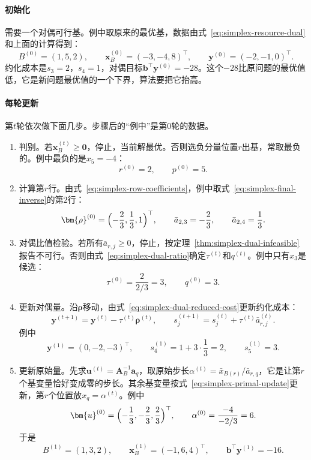 \paragraph{初始化}
需要一个对偶可行基。例中取原来的最优基，数据由式~\eqref{eq:simplex-resource-dual}和上面的计算得到：
\[
 B^{(0)}=(1,5,2),\qquad \bm{x}_B^{(0)}=(-3,-4,8)^\top,\qquad \bm{y}^{(0)}=(-2,-1,0)^\top.
\]
约化成本是$s_3=2$，$s_4=1$，对偶目标$\bm{b}^\top\bm{y}^{(0)}=-28$。这个$-28$比原问题的最优值低，它是新问题最优值的一个下界，算法要把它抬高。

\paragraph{每轮更新}
第$t$轮依次做下面几步。步骤后的“例中”是第$0$轮的数据。
\begin{enumerate}

 \item 判别。若$\bm{x}_B^{(t)}\geq\bm{0}$，停止，当前解最优。否则选负分量位置$r$出基，常取最负的。例中最负的是$x_5=-4$：
 \[
  r^{(0)}=2,\qquad p^{(0)}=5.
 \]

 \item 计算第$r$行。由式~\eqref{eq:simplex-row-coefficients}，例中取式~\eqref{eq:simplex-final-inverse}的第$2$行：
 \[
  \bm{\rho}^{(0)}=\Bigl(-\frac23,\frac13,1\Bigr)^\top,\qquad
  \bar{a}_{2,3}=-\frac23,\qquad \bar{a}_{2,4}=\frac13.
 \]

 \item 对偶比值检验。若所有$\bar{a}_{r,j}\geq0$，停止，按定理~\ref{thm:simplex-dual-infeasible}报告不可行。否则由式~\eqref{eq:simplex-dual-ratio}确定$\tau^{(t)}$和$q^{(t)}$。例中只有$x_3$是候选：
 \[
  \tau^{(0)}=\frac{2}{2/3}=3,\qquad q^{(0)}=3.
 \]

 \item 更新对偶量。沿$\bm{\rho}$移动，由式~\eqref{eq:simplex-dual-reduced-cost}更新约化成本：
 \begin{equation}
  \bm{y}^{(t+1)}=\bm{y}^{(t)}-\tau^{(t)}\bm{\rho}^{(t)},\qquad
  s_j^{(t+1)}=s_j^{(t)}+\tau^{(t)}\bar{a}_{r,j}^{(t)}.
  \label{eq:simplex-dual-update}
 \end{equation}
 例中
 \[
  \bm{y}^{(1)}=(0,-2,-3)^\top,\qquad s_4^{(1)}=1+3\cdot\frac13=2,\qquad s_5^{(1)}=3.
 \]

 \item 更新原始量。先求$\bm{u}^{(t)}=\bm{A}_B^{-1}\bm{a}_q$，取原始步长$\alpha^{(t)}=\bar{x}_{B(r)}/\bar{a}_{r,q}$，它是让第$r$个基变量恰好变成零的步长。其余基变量按式~\eqref{eq:simplex-primal-update}更新，第$r$个位置放$x_q=\alpha^{(t)}$。例中
 \[
  \bm{u}^{(0)}=\Bigl(-\frac13,-\frac23,\frac23\Bigr)^\top,\qquad
  \alpha^{(0)}=\frac{-4}{-2/3}=6.
 \]
 于是
 \[
  B^{(1)}=(1,3,2),\qquad \bm{x}_B^{(1)}=(-1,6,4)^\top,\qquad \bm{b}^\top\bm{y}^{(1)}=-16.
 \]
\end{enumerate}

